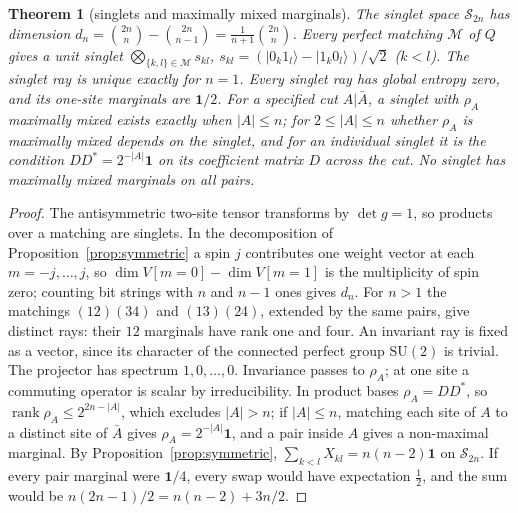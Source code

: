 \documentclass[aps,pra,onecolumn,superscriptaddress,nofootinbib,10pt]{revtex4-2}
\newtheorem{theorem}{Theorem}
\theoremstyle{definition}
\theoremstyle{remark}
\newcommand{\rk}{\operatorname{rank}}
\newcommand{\SU}{\mathrm{SU}}
\begin{document}
\begin{theorem}[singlets and maximally mixed marginals]\label{thm:cusinglet}
The singlet space $\mathcal S_{2n}$ has dimension $d_n=\binom{2n}{n}-\binom{2n}{n-1}=\frac1{n+1}\binom{2n}{n}$.  Every perfect
matching $\mathcal M$ of $Q$ gives a unit singlet $\bigotimes_{\{k,l\}\in\mathcal M}s_{kl}$, $s_{kl}=(\lvert0_k1_l\rangle-\lvert1_k0_l\rangle)/\sqrt2$ ($k<l$).  The
singlet ray is unique exactly for $n=1$.  Every singlet ray has global entropy zero, and its one-site
marginals are $\mathbf1/2$.  For a specified cut $A\vert\bar A$, a singlet with $\rho_A$ maximally mixed exists exactly when
$\lvert A\rvert\le n$; for $2\le\lvert A\rvert\le n$ whether $\rho_A$ is maximally mixed depends on the singlet, and for an individual
singlet it is the condition $DD^*=2^{-\lvert A\rvert}\mathbf1$ on its coefficient matrix $D$ across the cut.  No singlet has maximally
mixed marginals on all pairs.
\end{theorem}
\begin{proof}
The antisymmetric two-site tensor transforms by $\det g=1$, so products over a matching are singlets.  In
the decomposition of Proposition~\ref{prop:symmetric} a spin $j$ contributes one weight vector at each $m=-j,\dots,j$, so
$\dim V[m{=}0]-\dim V[m{=}1]$ is the multiplicity of spin zero; counting bit strings with $n$ and $n-1$ ones gives
$d_n$.  For $n>1$ the matchings $(12)(34)$ and $(13)(24)$, extended by the same pairs, give distinct rays: their
$12$ marginals have rank one and four.  An invariant ray is fixed as a vector, since its character of the
connected perfect group $\SU(2)$ is trivial.  The projector has spectrum $1,0,\dots,0$.  Invariance passes to
$\rho_A$; at one site a commuting operator is scalar by irreducibility.  In product bases $\rho_A=DD^*$, so
$\rk\rho_A\le2^{2n-\lvert A\rvert}$, which excludes $\lvert A\rvert>n$; if $\lvert A\rvert\le n$, matching each site of $A$ to a distinct site of $\bar A$
gives $\rho_A=2^{-\lvert A\rvert}\mathbf1$, and a pair inside $A$ gives a non-maximal marginal.  By Proposition~\ref{prop:symmetric},
$\sum_{k<l}X_{kl}=n(n-2)\mathbf1$ on $\mathcal S_{2n}$.  If every pair marginal were $\mathbf1/4$, every swap would have expectation $\tfrac12$,
and the sum would be $n(2n-1)/2=n(n-2)+3n/2$.
\end{proof}
\end{document}
